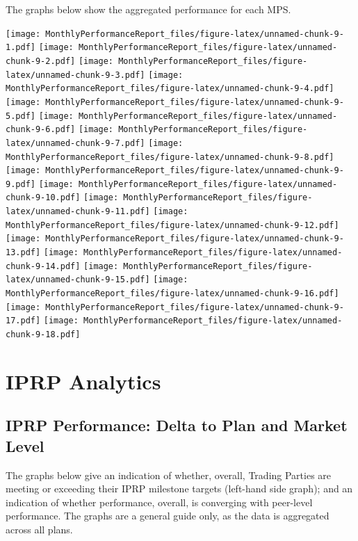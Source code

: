 \documentclass[12pt,table]{article}
\begin{document}
The graphs below show the aggregated performance for each MPS.

\texttt{[image: MonthlyPerformanceReport\_files/figure-latex/unnamed-chunk-9-1.pdf]}
\texttt{[image: MonthlyPerformanceReport\_files/figure-latex/unnamed-chunk-9-2.pdf]}
\texttt{[image: MonthlyPerformanceReport\_files/figure-latex/unnamed-chunk-9-3.pdf]}
\texttt{[image: MonthlyPerformanceReport\_files/figure-latex/unnamed-chunk-9-4.pdf]}
\texttt{[image: MonthlyPerformanceReport\_files/figure-latex/unnamed-chunk-9-5.pdf]}
\texttt{[image: MonthlyPerformanceReport\_files/figure-latex/unnamed-chunk-9-6.pdf]}
\texttt{[image: MonthlyPerformanceReport\_files/figure-latex/unnamed-chunk-9-7.pdf]}
\texttt{[image: MonthlyPerformanceReport\_files/figure-latex/unnamed-chunk-9-8.pdf]}
\texttt{[image: MonthlyPerformanceReport\_files/figure-latex/unnamed-chunk-9-9.pdf]}
\texttt{[image: MonthlyPerformanceReport\_files/figure-latex/unnamed-chunk-9-10.pdf]}
\texttt{[image: MonthlyPerformanceReport\_files/figure-latex/unnamed-chunk-9-11.pdf]}
\texttt{[image: MonthlyPerformanceReport\_files/figure-latex/unnamed-chunk-9-12.pdf]}
\texttt{[image: MonthlyPerformanceReport\_files/figure-latex/unnamed-chunk-9-13.pdf]}
\texttt{[image: MonthlyPerformanceReport\_files/figure-latex/unnamed-chunk-9-14.pdf]}
\texttt{[image: MonthlyPerformanceReport\_files/figure-latex/unnamed-chunk-9-15.pdf]}
\texttt{[image: MonthlyPerformanceReport\_files/figure-latex/unnamed-chunk-9-16.pdf]}
\texttt{[image: MonthlyPerformanceReport\_files/figure-latex/unnamed-chunk-9-17.pdf]}
\texttt{[image: MonthlyPerformanceReport\_files/figure-latex/unnamed-chunk-9-18.pdf]}

\newpage

\hypertarget{iprp-analytics}{%
\section{IPRP Analytics}\label{iprp-analytics}}

\hypertarget{iprp-performance-delta-to-plan-and-market-level}{%
\subsection{IPRP Performance: Delta to Plan and Market
Level}\label{iprp-performance-delta-to-plan-and-market-level}}

The graphs below give an indication of whether, overall, Trading Parties
are meeting or exceeding their IPRP milestone targets (left-hand side
graph); and an indication of whether performance, overall, is converging
with peer-level performance. The graphs are a general guide only, as the
data is aggregated across all plans.
\end{document}
